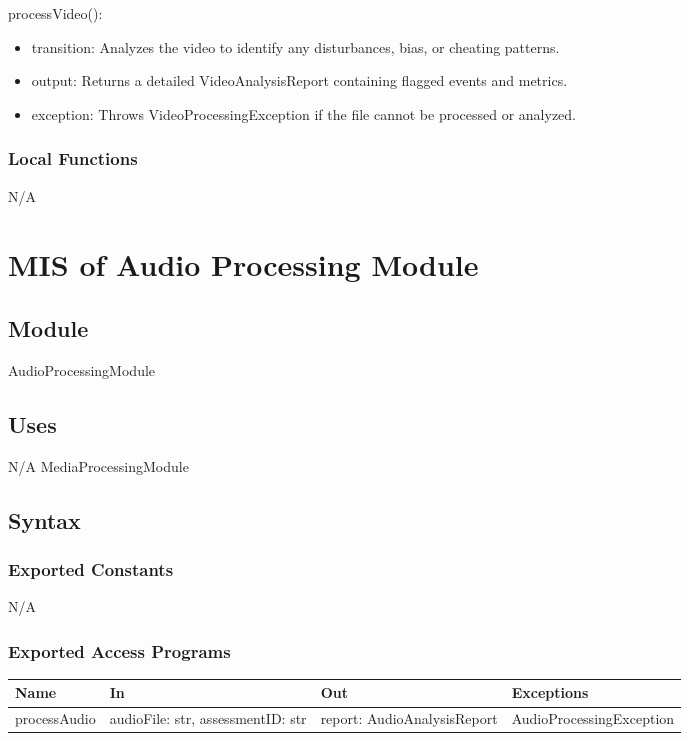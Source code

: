\documentclass[12pt, titlepage]{article}
\begin{document}
\noindent processVideo():
\begin{itemize}
\item transition: Analyzes the video to identify any disturbances, bias, or cheating patterns.
\item output: Returns a detailed VideoAnalysisReport containing flagged events and metrics.
\item exception: Throws VideoProcessingException if the file cannot be processed or analyzed.
\end{itemize}

\subsubsection{Local Functions}
N/A
\section{MIS of Audio Processing Module} \label{AudioProcessingModule}

\subsection{Module}
AudioProcessingModule

\subsection{Uses}
N/A
MediaProcessingModule

\subsection{Syntax}

\subsubsection{Exported Constants}
N/A

\subsubsection{Exported Access Programs}

\begin{center}
  \begin{tabular}{p{3cm} p{4cm} p{4cm} p{5cm}}
  \hline
  \textbf{Name} & \textbf{In} & \textbf{Out} & \textbf{Exceptions} \\
  \hline
  processAudio & \raggedright\arraybackslash audioFile: str, assessmentID: str & \raggedright\arraybackslash report: AudioAnalysisReport & \raggedright\arraybackslash AudioProcessingException \\
  \end{tabular}
\end{center}
\end{document}
